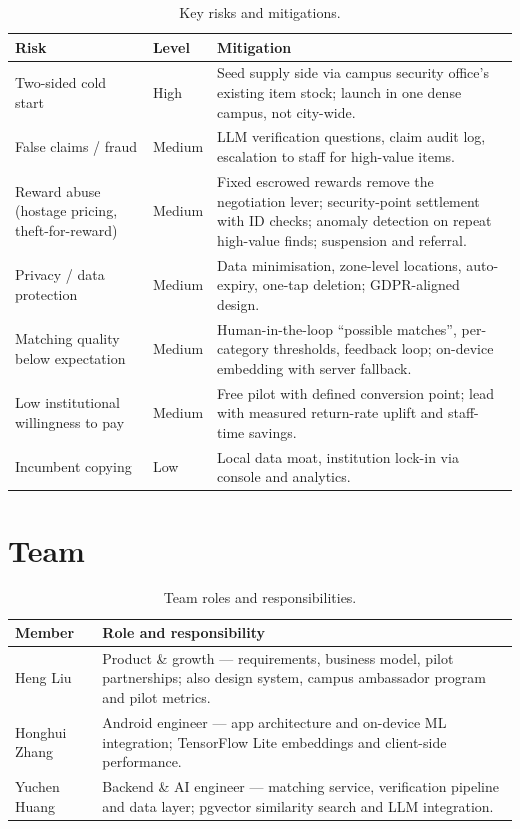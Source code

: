 \documentclass[11pt,a4paper]{article}
\begin{document}
\begin{table}[H]
\centering
\small
\renewcommand{\arraystretch}{1.35}
\begin{tabularx}{\textwidth}{>{\raggedright\arraybackslash}p{3.6cm} l Y}
\toprule
\textbf{Risk} & \textbf{Level} & \textbf{Mitigation} \\
\midrule
Two-sided cold start & High & Seed supply side via campus security office's existing item
stock; launch in one dense campus, not city-wide. \\
False claims / fraud & Medium & LLM verification questions, claim audit log, escalation to
staff for high-value items. \\
Reward abuse (hostage pricing, theft-for-reward) & Medium & Fixed escrowed rewards remove
the negotiation lever; security-point settlement with ID checks; anomaly detection on
repeat high-value finds; suspension and referral. \\
Privacy / data protection & Medium & Data minimisation, zone-level locations, auto-expiry,
one-tap deletion; GDPR-aligned design. \\
Matching quality below expectation & Medium & Human-in-the-loop ``possible matches'',
per-category thresholds, feedback loop; on-device embedding with server fallback. \\
Low institutional willingness to pay & Medium & Free pilot with defined conversion point;
lead with measured return-rate uplift and staff-time savings. \\
Incumbent copying & Low & Local data moat, institution lock-in via console and analytics. \\
\bottomrule
\end{tabularx}
\caption{Key risks and mitigations.}
\end{table}

\section{Team}

\begin{table}[H]
\centering
\small
\renewcommand{\arraystretch}{1.4}
\begin{tabularx}{\textwidth}{l Y}
\toprule
\textbf{Member} & \textbf{Role and responsibility} \\
\midrule
Heng Liu & Product \& growth --- requirements, business model, pilot partnerships; also
design system, campus ambassador program and pilot metrics. \\
Honghui Zhang & Android engineer --- app architecture and on-device ML integration;
TensorFlow Lite embeddings and client-side performance. \\
Yuchen Huang & Backend \& AI engineer --- matching service, verification pipeline and
data layer; pgvector similarity search and LLM integration. \\
\bottomrule
\end{tabularx}
\caption{Team roles and responsibilities.}
\end{table}
\end{document}

